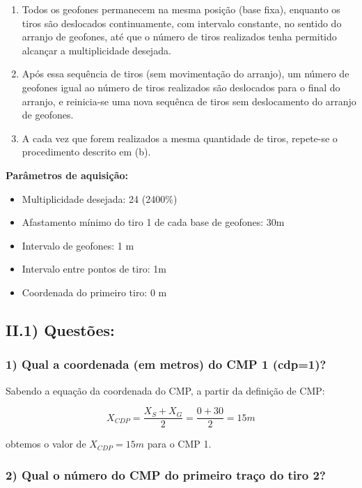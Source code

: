 \documentclass[12pt,a4paper]{article}
\begin{document}
\begin{enumerate}[label=\alph*)]
    \item Todos os geofones permanecem na mesma posição (base fixa), enquanto os tiros são deslocados continuamente, com intervalo constante, no sentido do arranjo de geofones, até que o número de tiros realizados tenha permitido alcançar a multiplicidade desejada.
    \item Após essa sequência de tiros (sem movimentação do arranjo), um número de geofones igual ao número de tiros realizados são deslocados para o final do arranjo, e reinicia-se uma nova sequênca de tiros sem deslocamento do arranjo de geofones.
    \item A cada vez que forem realizados a mesma quantidade de tiros, repete-se o procedimento descrito em (b).
\end{enumerate}

\textbf{Parâmetros de aquisição:}
\begin{itemize}[leftmargin=2cm]
    \item Multiplicidade desejada: 24 (2400\%)
    \item Afastamento mínimo do tiro 1 de cada base de geofones: 30m
    \item Intervalo de geofones: 1 m
    \item Intervalo entre pontos de tiro: 1m
    \item Coordenada do primeiro tiro: 0 m
\end{itemize}

\subsection{II.1) Questões:}

\subsubsection{1) Qual a coordenada (em metros) do CMP 1 (cdp=1)?}

Sabendo a equação da coordenada do CMP, a partir da definição de CMP:

$$ X_{CDP} = \frac{X_S + X_G}{2} = \frac{0 + 30}{2} = 15m$$

\noindent
obtemos o valor de $X_{CDP} = 15m$ para o CMP 1.


\subsubsection{2) Qual o número do CMP do primeiro traço do tiro 2?}
\end{document}
